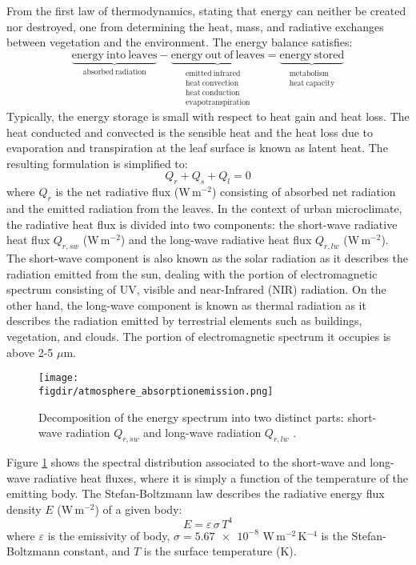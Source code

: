 From the first law of thermodynamics, stating that energy can neither be created nor destroyed, one from determining the heat, mass, and radiative exchanges between vegetation and the environment. The energy balance satisfies:
\begin{equation}
\underbrace{\mathrm{energy\ into\ leaves}}_{\mathrm{absorbed\ radiation}}
- \underbrace{\mathrm{energy\ out\ of\ leaves} }_{\substack{\mathrm{emitted\ infrared}\\\mathrm{heat\ convection}\\\mathrm{heat\ conduction}\\\mathrm{evapotranspiration}}} = \underbrace{\mathrm{energy\ stored}}_{\substack{\mathrm{metabolism}\\\mathrm{heat\ capacity}}}
\end{equation}
Typically, the energy storage is small with respect to heat gain and heat loss. The heat conducted and convected is the sensible heat and the heat loss due to evaporation and transpiration at the leaf surface is known as latent heat. The resulting formulation is simplified to:
\begin{equation}
Q_r + Q_s + Q_l = 0
\end{equation}
where $Q_r$ is the net radiative flux (W\,m$^{-2}$) consisting of absorbed net radiation and the emitted radiation from the leaves. In the context of urban microclimate, the radiative heat flux is divided into two components: the short-wave radiative heat flux $Q_{r,sw}$ (W\,m$^{-2}$) and the long-wave radiative heat flux $Q_{r,lw}$ (W\,m$^{-2}$). The short-wave component is also known as the solar radiation as it describes the radiation emitted from the sun, dealing with the portion of electromagnetic spectrum consisting of UV, visible and near-Infrared (NIR) radiation. On the other hand, the long-wave component is known as thermal radiation as it describes the radiation emitted by terrestrial elements such as buildings, vegetation, and clouds. The portion of electromagnetic spectrum it occupies is above 2-5 $\mu$m. 

\begin{figure}[t]
	\centering
	\texttt{[image: \\figdir/atmosphere\_absorptionemission.png]}
	\caption{Decomposition of the energy spectrum into two distinct parts: short-wave radiation $Q_{r,sw}$ and long-wave radiation $Q_{r,lw}$ \citep{Oke2017a}.}
	\label{fig:atmosphere_absorptionemission}
\end{figure}

Figure \ref{fig:atmosphere_absorptionemission} shows the spectral distribution associated to the short-wave and long-wave radiative heat fluxes, where it is simply a function of the temperature of the emitting body. The Stefan-Boltzmann law describes the radiative energy flux density $E$  (W\,m$^{-2}$) of a given body:
\begin{equation}
E = \varepsilon\,\sigma\,T^4
\end{equation}  
where $\varepsilon$ is the emissivity of body, $\sigma = \num{5.67e-8}$ W\,m$^{-2}$\,K$^{-4}$ is the Stefan-Boltzmann constant, and $T$ is the surface temperature (K). 

